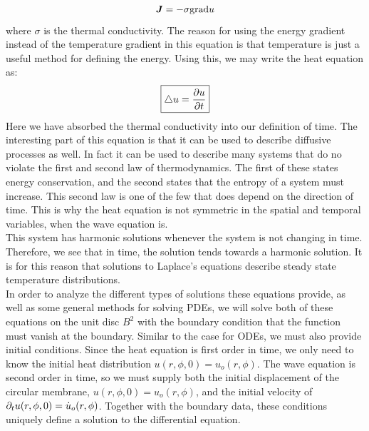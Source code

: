 \documentclass{article}
\begin{document}
\begin{equation}
  \bm{J}=-\sigma\mathrm{grad} u
\end{equation}
where $\sigma$ is the thermal conductivity. The reason for using the energy gradient instead of the temperature gradient in this equation is that temperature is just a useful method for defining the energy. Using this, we may write the heat equation as:
\begin{equation}
  \boxed{
    \bigtriangleup u = \frac{\partial u}{\partial t}
  }
\end{equation}
Here we have absorbed the thermal conductivity into our definition of time. The interesting part of this equation is that it can be used to describe diffusive processes as well. In fact it can be used to describe many systems that do no violate the first and second law of thermodynamics. The first of these states energy conservation, and the second states that the entropy of a system must increase. This second law is one of the few that does depend on the direction of time. This is why the heat equation is not symmetric in the spatial and temporal variables, when the wave equation is.\\
This system has harmonic solutions whenever the system is not changing in time. Therefore, we see that in time, the solution tends towards a harmonic solution. It is for this reason that solutions to Laplace's equations describe steady state temperature distributions.\\
In order to analyze the different types of solutions these equations provide, as well as some general methods for solving PDEs, we will solve both of these equations on the unit disc $B^2$ with the boundary condition that the function must vanish at the boundary. Similar to the case for ODEs, we must also provide initial conditions. Since the heat equation is first order in time, we only need to know the initial heat distribution $u(r,\phi,0)=u_o(r,\phi)$. The wave equation is second order in time, so we must supply both the initial displacement of the circular membrane, $u(r,\phi,0)=u_o(r,\phi)$, and the initial velocity of $\partial_{t} u(r,\phi,0)=\dot{u}_o(r,\phi)$. Together with the boundary data, these conditions uniquely define a solution to the differential equation.
\end{document}
